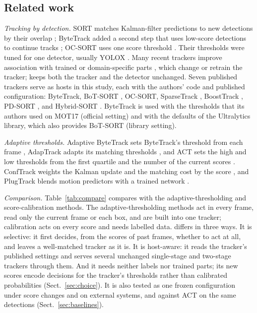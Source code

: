 \subsection{Related work}\label{sec:survey}
\emph{Tracking by detection.}\label{sec:hosts} SORT matches Kalman-filter predictions to new
detections by their overlap \cite{bewley2016sort}; ByteTrack added a second step that uses
low-score detections to continue tracks \cite{zhang2022bytetrack}; OC-SORT uses one score
threshold \cite{cao2023ocsort}. Their thresholds were tuned for one detector, usually YOLOX
\cite{ge2021yolox}. Many recent trackers improve association with trained or domain-specific
parts \cite{li2024fdbtrack,bao2024graphmatching,zhang2025sinkhorn,ding2025remot,liang2024motiontrack,sun2026bsr},
which change or retrain the tracker; \scl{} keeps both the tracker and the detector unchanged.
Seven published trackers serve as hosts in this study, each with the authors' code and published
configuration: ByteTrack, BoT-SORT \cite{aharon2022botsort}, OC-SORT, SparseTrack
\cite{liu2025sparsetrack}, BoostTrack \cite{stanojevic2024boosttrack}, PD-SORT
\cite{wang2025pdsort}, and Hybrid-SORT \cite{yang2024hybridsort}. ByteTrack is used with the
thresholds that its authors used on MOT17 (official setting) and with the defaults of the
Ultralytics library, which also provides BoT-SORT (library setting).

\emph{Adaptive thresholds.} Adaptive ByteTrack sets ByteTrack's threshold from each frame
\cite{ma2023adaptivebytetrack}, AdapTrack adapts its matching thresholds \cite{shim2024adaptrack},
and ACT sets the high and low thresholds from the first quartile and the number of the current
scores \cite{act2026adaptive}. ConfTrack weights the Kalman update and the matching cost by the
score \cite{jung2024conftrack}, and PlugTrack blends motion predictors with a trained network
\cite{kim2026plugtrack}.

\emph{Comparison.} Table~\ref{tab:compare} compares \scl{} with the adaptive-thresholding and
score-calibration methods. The adaptive-thresholding methods act in every frame, read only the
current frame or each box, and are built into one tracker; calibration acts on every score and
needs labelled data. \scl{} differs in three ways. It is selective: it first decides, from the
scores of past frames, whether to act at all, and leaves a well-matched tracker as it is. It is
host-aware: it reads the tracker's published settings and serves several unchanged single-stage
and two-stage trackers through them. And it needs neither labels nor trained parts; its new scores
encode decisions for the tracker's thresholds rather than calibrated probabilities
(Sect.~\ref{sec:choice}). It is also tested as one frozen configuration under score changes and on
external systems, and against ACT on the same detections (Sect.~\ref{sec:baselines}).

